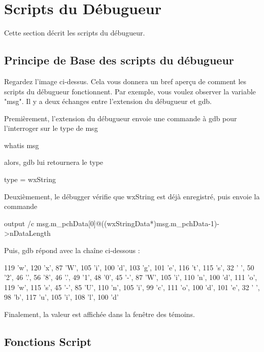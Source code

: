 \section{Scripts du Débugueur}\label{sec:debugger_scripts}
Cette section décrit les scripts du débugueur.
\subsection{Principe de Base des scripts du débugueur}


Regardez l'image ci-dessus. Cela vous donnera un bref aperçu de comment les scripts du débugueur fonctionnent. Par exemple, vous voulez observer la variable "msg". Il y a deux échanges entre l'extension du débugueur et gdb.

Premièrement, l'extension du débugueur envoie une commande à gdb pour l'interroger sur le type de msg

\begin{code}
whatis msg
\end{code}

alors, gdb lui retournera le type

\begin{code}
type = wxString
\end{code}

Deuxièmement, le débugger vérifie que wxString est déjà enregistré, puis envoie la commande

\begin{code}
output /c msg.m_pchData[0]@((wxStringData*)msg.m_pchData-1)->nDataLength
\end{code}

Puis, gdb répond avec la chaîne ci-dessous :

\begin{code}
{119 'w', 120 'x', 87 'W', 105 'i', 100 'd', 103 'g', 101 'e', 116 't', 
115 's', 32 ' ', 50 '2', 46 '.', 56 '8', 46 '.', 49 '1', 48 '0', 45 '-', 
87 'W', 105 'i', 110 'n', 100 'd', 111 'o', 119 'w', 115 's', 45 '-', 
85 'U', 110 'n', 105 'i', 99 'c', 111 'o', 100 'd', 101 'e', 32 ' ', 
98 'b', 117 'u', 105 'i', 108 'l', 100 'd'}
\end{code}

Finalement, la valeur est affichée dans la fenêtre des témoins.

\subsection{Fonctions Script}

